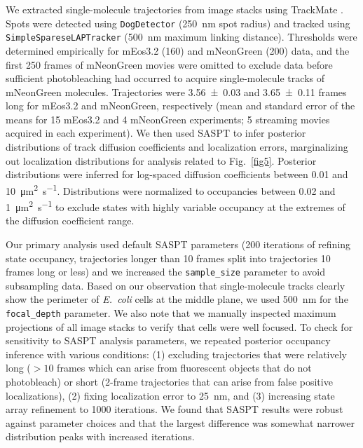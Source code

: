 \documentclass[pdflatex,sn-nature]{sn-jnl}%
\newcommand\ec{\textit{E.~coli}}
\begin{document}
We extracted single-molecule trajectories from image stacks using TrackMate \citep{tinevezTrackMateOpenExtensible2017}. Spots were detected using \verb|DogDetector| (\qty{250}{\nm} spot radius) and tracked using \verb|SimpleSpareseLAPTracker| (\qty{500}{\nm} maximum linking distance).
Thresholds were determined empirically for mEos3.2 (160) and mNeonGreen (200) data, and the first 250 frames of mNeonGreen movies were omitted to exclude data before sufficient photobleaching had occurred to acquire single-molecule tracks of mNeonGreen molecules.
Trajectories were \num{3.56 +- 0.03} and \num{3.65 +- 0.11} frames long for mEos3.2 and mNeonGreen, respectively (mean and standard error of the means for 15 mEos3.2 and 4 mNeonGreen experiments; 5 streaming movies acquired in each experiment).
We then used SASPT \citep{heckertRecoveringMixturesFastdiffusing2022a} to infer posterior distributions of track diffusion coefficients and localization errors, marginalizing out localization distributions for analysis related to Fig.~\ref{fig5}.
Posterior distributions were inferred for log-spaced diffusion coefficients between \num{0.01} and \qty{10}{\square\um\per\s}.
Distributions were normalized to occupancies between \num{0.02} and \qty{1}{\square\um\per\s} to exclude states with highly variable occupancy at the extremes of the diffusion coefficient range.

Our primary analysis used default SASPT parameters (200 iterations of refining state occupancy, trajectories longer than 10 frames split into trajectories 10 frames long or less) and we increased the \verb|sample_size| parameter to avoid subsampling data.
Based on our observation that single-molecule tracks clearly show the perimeter of \ec{} cells at the middle plane, we used \qty{500}{\nm} for the \verb|focal_depth| parameter.
We also note that we manually inspected maximum projections of all image stacks to verify that cells were well focused.
To check for sensitivity to SASPT analysis parameters, we repeated posterior occupancy inference with various conditions: (1) excluding trajectories that were relatively long ($>10$ frames which can arise from fluorescent objects that do not photobleach) or short (2-frame trajectories that can arise from false positive localizations), (2) fixing localization error to \qty{25}{\nm}, and (3) increasing state array refinement to \num{1000} iterations.
We found that SASPT results were robust against parameter choices and that the largest difference was somewhat narrower distribution peaks with increased iterations.
\end{document}
